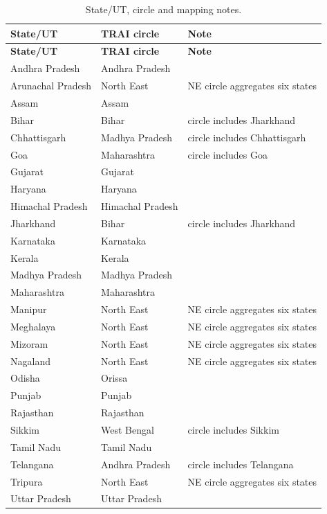 \documentclass[runningheads]{llncs}
\begin{document}
\small
\begin{longtable}{@{}P{.29\textwidth}P{.25\textwidth}P{.38\textwidth}@{}}
\caption{State/UT, circle and mapping notes.}\label{tab:B1}\\
\toprule
\textbf{State/UT} & \textbf{TRAI circle} & \textbf{Note} \\
\midrule
\endfirsthead
\toprule
\textbf{State/UT} & \textbf{TRAI circle} & \textbf{Note} \\
\midrule
\endhead
\bottomrule
\endfoot
Andhra Pradesh & Andhra Pradesh &  \\
Arunachal Pradesh & North East & NE circle aggregates six states \\
Assam & Assam &  \\
Bihar & Bihar & circle includes Jharkhand \\
Chhattisgarh & Madhya Pradesh & circle includes Chhattisgarh \\
Goa & Maharashtra & circle includes Goa \\
Gujarat & Gujarat &  \\
Haryana & Haryana &  \\
Himachal Pradesh & Himachal Pradesh &  \\
Jharkhand & Bihar & circle includes Jharkhand \\
Karnataka & Karnataka &  \\
Kerala & Kerala &  \\
Madhya Pradesh & Madhya Pradesh &  \\
Maharashtra & Maharashtra &  \\
Manipur & North East & NE circle aggregates six states \\
Meghalaya & North East & NE circle aggregates six states \\
Mizoram & North East & NE circle aggregates six states \\
Nagaland & North East & NE circle aggregates six states \\
Odisha & Orissa &  \\
Punjab & Punjab &  \\
Rajasthan & Rajasthan &  \\
Sikkim & West Bengal & circle includes Sikkim \\
Tamil Nadu & Tamil Nadu &  \\
Telangana & Andhra Pradesh & circle includes Telangana \\
Tripura & North East & NE circle aggregates six states \\
Uttar Pradesh & Uttar Pradesh &  \\

\end{longtable}
\end{document}

